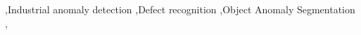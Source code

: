 \documentclass[a4paper,fleqnn]{cas-sc}
\begin{document}

\begin{keywords}
 \sep Industrial anomaly detection \sep  Defect recognition \sep Object Anomaly Segmentation \sep
\end{keywords}

\maketitle


% 
%

%

%







\end{document}
